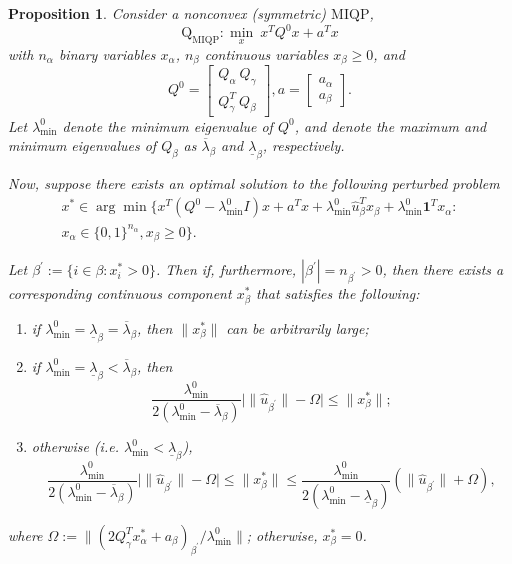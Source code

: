 \documentclass[]{article}
\newtheorem{proposition}{Proposition}
\begin{document}
\begin{proposition} \label{prop:org_lambda}
    Consider a nonconvex (symmetric) $\mathrm{MIQP}$, 
    \[\mathrm{Q}_{\mathrm{MIQP}}: \min_x\ x^TQ^0x + a^Tx\]
    with $n_\alpha$ binary variables $x_\alpha$, $n_\beta$ continuous variables $x_\beta\geq 0$, and
    \[Q^0=\begin{bmatrix}
            Q_\alpha\ Q_\gamma \\
            Q_\gamma^T\ Q_\beta
        \end{bmatrix}, a = \begin{bmatrix}
            a_\alpha\\
            a_\beta
        \end{bmatrix}.\]
    Let $\lambda_{\min}^0$ denote the minimum eigenvalue of $Q^0$, and denote the maximum and minimum eigenvalues of $Q_\beta$ as $\overline{\lambda}_\beta$ and $\underline{\lambda}_\beta$, respectively. 

Now, suppose there exists an optimal solution to the following perturbed problem \[\begin{split}x^*\in\arg\min\{x^T(Q^0-\lambda_{\min}^0I)x+a^Tx +\lambda_{\min}^0\hat{u}_\beta^Tx_\beta + \lambda_{\min}^0\mathbf{1}^T x_\alpha: \\x_\alpha\in\{0,1\}^{n_\alpha}, x_\beta\geq 0\}.\end{split}\] 
    
    Let $\beta^\prime :=\{i\in\beta: x_i^* > 0\}$. Then if, furthermore, $|\beta^\prime| = n_{\beta^\prime} > 0$, then there exists a corresponding continuous component $x^*_\beta$ that satisfies the following:
    \begin{enumerate}
        \item if $\lambda_{\min}^0 = \underline{\lambda}_\beta =\overline{\lambda}_\beta$, then $\|x^*_\beta\|$ can be arbitrarily large;
        \item if $\lambda_{\min}^0 = \underline{\lambda}_\beta <\overline{\lambda}_\beta$, then
        \[\frac{\lambda_{\min}^0}{2(\lambda_{\min}^0 - \overline{\lambda}_\beta)}\bigl| \|\hat{u}_{\beta^\prime}\| - \Omega \bigr| \leq \|x_\beta^*\| ;\]
        \item otherwise (i.e. $\lambda_{\min}^0 < \underline{\lambda}_\beta$), 
        \[\frac{\lambda_{\min}^0}{2(\lambda_{\min}^0 - \overline{\lambda}_\beta)}\bigl| \|\hat{u}_{\beta^\prime}\| - \Omega \bigr| \leq \|x_\beta^*\| \leq \frac{\lambda_{\min}^0}{2(\lambda_{\min}^0 - \underline{\lambda}_\beta)}(\|\hat{u}_{\beta^\prime}\| + \Omega),\]
    \end{enumerate}
    where $\Omega := \bigl\|(2Q_\gamma^T x_\alpha^* + a_{\beta})_{\beta^\prime}/\lambda_{\min}^0\bigr\|$; otherwise, $x_\beta^* = 0$.
\end{proposition} 
\end{document}
